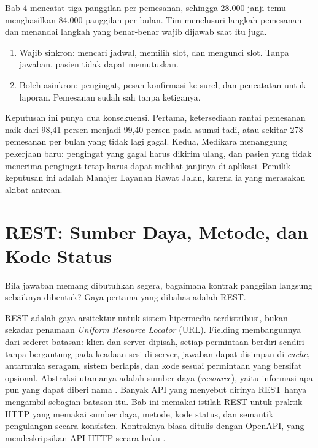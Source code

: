 \begin{kasus}[title={Kasus Medikara Health: Aplikasi Pasien yang Menunggu Semua Pihak}]
Bab 4 mencatat tiga panggilan per pemesanan, sehingga 28.000 janji temu menghasilkan 84.000 panggilan per bulan. Tim
menelusuri langkah pemesanan dan menandai langkah yang benar-benar wajib dijawab saat itu juga.
\begin{enumerate}
  \item Wajib sinkron: mencari jadwal, memilih slot, dan mengunci slot. Tanpa jawaban, pasien tidak dapat memutuskan.
  \item Boleh asinkron: pengingat, pesan konfirmasi ke surel, dan pencatatan untuk laporan. Pemesanan sudah sah tanpa
        ketiganya.
\end{enumerate}

Keputusan ini punya dua konsekuensi. Pertama, ketersediaan rantai pemesanan naik dari 98,41 persen menjadi 99,40
persen pada asumsi tadi, atau sekitar 278 pemesanan per bulan yang tidak lagi gagal. Kedua, Medikara menanggung
pekerjaan baru: pengingat yang gagal harus dikirim ulang, dan pasien yang tidak menerima pengingat tetap harus dapat
melihat janjinya di aplikasi. Pemilik keputusan ini adalah Manajer Layanan Rawat Jalan, karena ia yang merasakan akibat
antrean.
\end{kasus}

\section{REST: Sumber Daya, Metode, dan Kode Status}

Bila jawaban memang dibutuhkan segera, bagaimana kontrak panggilan langsung sebaiknya dibentuk? Gaya pertama yang
dibahas adalah REST.

REST adalah gaya arsitektur untuk sistem hipermedia terdistribusi, bukan sekadar penamaan \textit{Uniform Resource
Locator} (URL). Fielding membangunnya dari sederet batasan: klien dan server dipisah, setiap permintaan berdiri sendiri tanpa
bergantung pada keadaan sesi di server, jawaban dapat disimpan di \textit{cache}, antarmuka seragam, sistem berlapis, dan
kode sesuai permintaan yang bersifat opsional. Abstraksi utamanya adalah sumber daya (\textit{resource}), yaitu informasi
apa pun yang dapat diberi nama \cite{c05-fielding2000rest}. Banyak API yang menyebut dirinya REST hanya mengambil sebagian
batasan itu. Bab ini memakai istilah REST untuk praktik HTTP yang memakai sumber daya, metode, kode status, dan semantik
pengulangan secara konsisten. Kontraknya biasa ditulis dengan OpenAPI, yang mendeskripsikan API HTTP secara baku
\cite{openapi32}.

